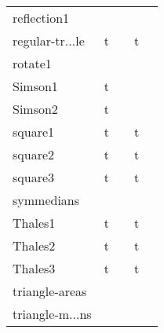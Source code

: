 {\begin{longtable}{|l|*{2}{cr|}}
& \cellcolor{yellow!25} & \cellcolor{yellow!25}{ 230} 
\\ \hline
\cellcolor{blue!10}reflection1 
& \cellcolor{yellow!25} & \cellcolor{yellow!25}{ 8} 
& \cellcolor{yellow!25} & \cellcolor{yellow!25}{ 231} 
\\ \hline
\cellcolor{blue!10}regular-tr$\ldots$le 
& \cellcolor{green!50}t & \cellcolor{green!50}{\bf 33} 
& \cellcolor{green!30}t & \cellcolor{green!30}{\sl 259} 
\\ \hline
\cellcolor{blue!10}rotate1 
& \cellcolor{yellow!25} & \cellcolor{yellow!25}{ 17} 
& \cellcolor{yellow!25} & \cellcolor{yellow!25}{ 253} 
\\ \hline
\cellcolor{blue!10}Simson1 
& \cellcolor{green!50}t & \cellcolor{green!50}{\bf 48} 
& \cellcolor{yellow!25} & \cellcolor{yellow!25}{ 655} 
\\ \hline
\cellcolor{blue!10}Simson2 
& \cellcolor{green!50}t & \cellcolor{green!50}{\bf 46} 
& \cellcolor{yellow!25} & \cellcolor{yellow!25}{ 703} 
\\ \hline
\cellcolor{blue!10}square1 
& \cellcolor{green!50}t & \cellcolor{green!50}{\bf 39} 
& \cellcolor{green!30}t & \cellcolor{green!30}{\sl 267} 
\\ \hline
\cellcolor{blue!10}square2 
& \cellcolor{green!50}t & \cellcolor{green!50}{\bf 42} 
& \cellcolor{green!30}t & \cellcolor{green!30}{\sl 259} 
\\ \hline
\cellcolor{blue!10}square3 
& \cellcolor{green!50}t & \cellcolor{green!50}{\bf 37} 
& \cellcolor{green!30}t & \cellcolor{green!30}{\sl 245} 
\\ \hline
\cellcolor{blue!10}symmedians 
& \cellcolor{yellow!25} & \cellcolor{yellow!25}{ 9} 
& \cellcolor{yellow!25} & \cellcolor{yellow!25}{ 232} 
\\ \hline
\cellcolor{blue!10}Thales1 
& \cellcolor{green!50}t & \cellcolor{green!50}{\bf 46} 
& \cellcolor{green!30}t & \cellcolor{green!30}{\sl 262} 
\\ \hline
\cellcolor{blue!10}Thales2 
& \cellcolor{green!50}t & \cellcolor{green!50}{\bf 39} 
& \cellcolor{green!30}t & \cellcolor{green!30}{\sl 266} 
\\ \hline
\cellcolor{blue!10}Thales3 
& \cellcolor{green!50}t & \cellcolor{green!50}{\bf 44} 
& \cellcolor{green!30}t & \cellcolor{green!30}{\sl 251} 
\\ \hline
\cellcolor{blue!10}triangle-areas 
& \cellcolor{yellow!25} & \cellcolor{yellow!25}{ 53} 
& \cellcolor{yellow!25} & \cellcolor{yellow!25}{ 300} 
\\ \hline
\cellcolor{blue!10}triangle-m$\ldots$ns 

\end{longtable}}
